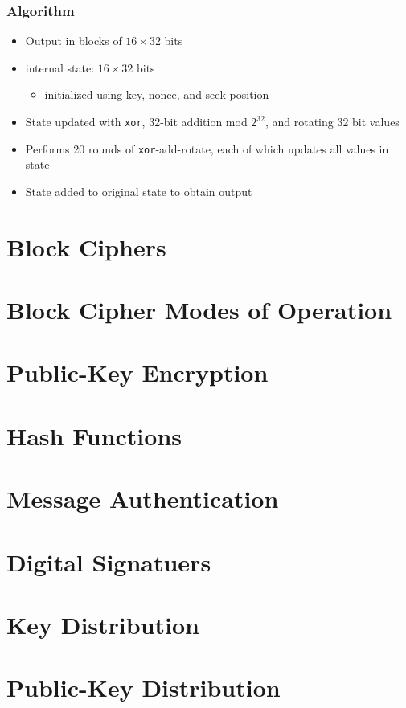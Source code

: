 \documentclass[draft]{article}
\begin{document}
\subsubsection*{Algorithm}
\begin{itemize}[nosep]
    \item Output in blocks of $16\times32$ bits
    \item internal state: $16\times 32$ bits
          \begin{itemize}[nosep]\item initialized using key, nonce, and seek position\end{itemize}
    \item State updated with \texttt{xor}, 32-bit addition mod $2^{32}$, and rotating 32 bit values
    \item Performs 20 rounds of \texttt{xor}-add-rotate, each of which updates all values in state
    \item State added to original state to obtain output
\end{itemize}
\section{Block Ciphers}
\section{Block Cipher Modes of Operation}
\section{Public-Key Encryption}
\section{Hash Functions}
\section{Message Authentication}
\section{Digital Signatuers}
\section{Key Distribution}
\section{Public-Key Distribution}
\clearpage

\glsaddall
\printglossary[nonumberlist]
\printglossary[nonumberlist,type=\acronymtype]
\end{document}
